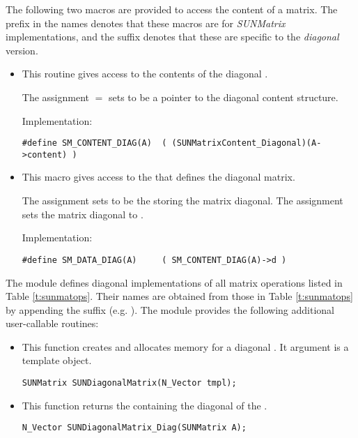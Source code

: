 \noindent The following two macros are provided to access the
content of a {\sunmatdiag} matrix. The prefix  in the names
denotes that these macros are for \emph{SUNMatrix} implementations,
and the suffix  denotes that these are specific to
the \emph{diagonal} version.
\begin{itemize}

\item {}
    
  This routine gives access to the contents of the
  diagonal .
  
  The assignment  $=$  sets
   to be a pointer to the diagonal  content
  structure.                                             
                                                            
  Implementation: 
  
  \verb|#define SM_CONTENT_DIAG(A)  ( (SUNMatrixContent_Diagonal)(A->content) )|
  
\item {}
                                                            
  This macro gives access to the {\nvector}  that defines the
  diagonal matrix.

  The assignment  sets  to be     
  the {\nvector} storing the matrix diagonal.  The
  assignment  sets the {\nvector}
  matrix diagonal to .
  
  Implementation:

  \verb|#define SM_DATA_DIAG(A)     ( SM_CONTENT_DIAG(A)->d )|

\end{itemize}
The {\sunmatdiag} module defines diagonal implementations of all
matrix operations listed in Table \ref{t:sunmatops}. Their names are
obtained from those in Table \ref{t:sunmatops} by appending the
suffix  (e.g. ). 
The module {\sunmatdiag} provides the following additional
user-callable routines: 
\begin{itemize}


\item {}

  This function creates and allocates memory for a diagonal .
  It argument is a template {\nvector} object.

  \verb|SUNMatrix SUNDiagonalMatrix(N_Vector tmpl);|


\item {}

  This function returns the {\nvector} containing the diagonal of
  the . 
 
  \verb|N_Vector SUNDiagonalMatrix_Diag(SUNMatrix A);|

\end{itemize}
